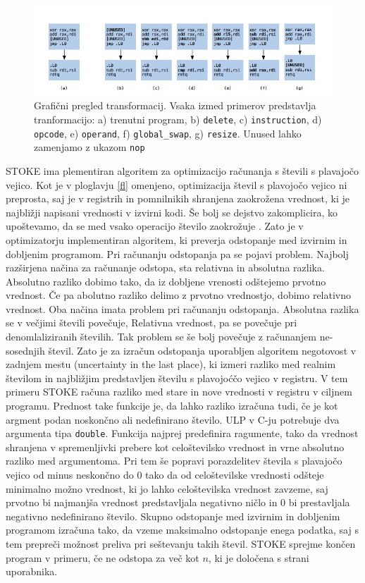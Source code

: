 \documentclass[a4paper, 12pt]{book}
\begin{document}
	\begin{figure}[htb]
		\begin{center}
			\includegraphics[width=13.5cm]{graf2.jpg}
		\end{center}
		\caption{Grafični pregled transformacij. Vsaka izmed primerov predstavlja tranformacijo: a) trenutni program, b) \texttt{delete}, c) \texttt{instruction}, d) \texttt{opcode}, e) \texttt{operand}, f) \texttt{global\_swap}, g) \texttt{resize}. Unused lahko zamenjamo z ukazom \texttt{nop}}
		\label{pic2}
	\end{figure}
	STOKE ima plementiran algoritem za optimizacijo računanja s števili s plavajočo vejico. Kot je v ploglavju \ref{fl} omenjeno, optimizacija števil s plavojočo vejico ni preprosta, saj je v registrih in pomnilnikih shranjena zaokrožena vrednost, ki je najbližji napisani vrednosti v izvirni kodi. Še bolj se dejstvo zakomplicira, ko upoštevamo, da se med vsako operacijo število zaokrožuje \cite{float2}. Zato je v optimizatorju implementiran algoritem, ki preverja odstopanje med izvirnim in dobljenim programom. Pri računanju odstopanja pa se pojavi problem. Najbolj razširjena načina za računanje odstopa, sta relativna in absolutna razlika. Absolutno razliko dobimo tako, da iz dobljene vrenosti odštejemo prvotno vrednost. Če pa abolutno razliko delimo z prvotno vrednostjo, dobimo relativno vrednost. Oba načina imata problem pri računanju odstopanja. Absolutna razlika se v večjimi števili povečuje, Relativna vrednost, pa se povečuje pri denomlaliziranih številih. Tak problem se še bolj povečuje z računanjem ne-sosednjih števil. Zato je za izračun odstopanja uporabljen algoritem negotovost v zadnjem mestu (uncertainty in the last place), ki izmeri razliko med realnim številom in najbližjim predstavljen številu s plavojoćčo vejico v registru. V tem primeru STOKE računa razliko med stare in nove vrednosti v registru v ciljnem programu. Prednost take funkcije je, da lahko razliko izračuna tudi, če je kot argment podan noskončno ali nedefinirano število. ULP v C-ju potrebuje dva argumenta tipa \texttt{double}. Funkcija najprej predefinira ragumente, tako da vrednost shranjena v spremenljivki prebere kot celoštevilsko vrednost in vrne absolutno razliko med argumentoma. Pri tem še popravi porazdelitev števila s plavajočo vejico od minus neskončno do 0 tako da od celoštevilske vrednosti odšteje minimalno možno vrednost, ki jo lahko celoštevilska vrednost zavzeme, saj prvotno bi najmanjša vrednost predstavljala negativno ničlo in 0 bi prestavljala negativno nedefinirano število. Skupno odstopanje med izvirnim in dobljenim programom izračuna tako, da vzeme maksimalno odstopanje enega podatka, saj s tem prepreči možnost preliva pri seštevanju takih števil. STOKE sprejme končen program v primeru, če ne odstopa za več kot \(n\), ki je določena s strani uporabnika.
	
\end{document}
